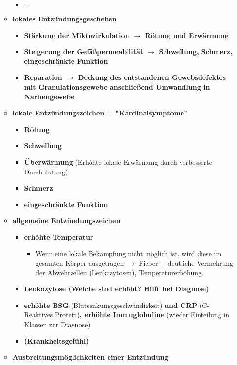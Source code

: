 \begin{itemize}
\begin{itemize}
\begin{itemize}
				\item \textbf{$\dots$}
			\end{itemize}
		\item \textbf{lokales Entzündungsgeschehen}
			\begin{itemize}
				\item \textbf{Stärkung der Miktozirkulation $\rightarrow$ Rötung und Erwärmung}
				\item \textbf{Steigerung der Gefäßpermeabilität $\rightarrow$ Schwellung, Schmerz, eingeschränkte Funktion}
				\item \textbf{Reparation $\rightarrow$ Deckung des entstandenen Gewebsdefektes mit Granulationsgewebe anschließend Umwandlung in Narbengewebe}
			\end{itemize}
		\item \textbf{lokale Entzündungszeichen = "Kardinalsymptome"}
			\begin{itemize}
				\item \textbf{Rötung}
				\item \textbf{Schwellung}
				\item \textbf{Überwärmung} (Erhöhte lokale Erwärmung durch verbesserte Durchblutung)
				\item \textbf{Schmerz}
				\item \textbf{eingeschränkte Funktion}
			\end{itemize}
\pagebreak
		\item \textbf{allgemeine Entzündungszeichen}
			\begin{itemize}
				\item \textbf{erhöhte Temperatur}
					\begin{itemize}
						\item Wenn eine lokale Bekämpfung nicht möglich ist, wird diese im gesamten Körper ausgetragen $\rightarrow$ Fieber + deutliche Vermehrung der Abwehrzellen (Leukozytosen), Temperaturerhöhung.
					\end{itemize}
				\item \textbf{Leukozytose (Welche sind erhöht? Hilft bei Diagnose)}
				\item \textbf{erhöhte BSG} (Blutsenkungsgeschwindigkeit) \textbf{und CRP} (C-Reaktives Protein)\textbf{, erhöhte Immuglobuline} (wieder Einteilung in Klassen zur Diagnose)
				\item \textbf{(Krankheitsgefühl)}
			\end{itemize}
		\item \textbf{Ausbreitungsmöglichkeiten einer Entzündung}
			\begin{itemize}

\end{itemize}
\end{itemize}
\end{itemize}
